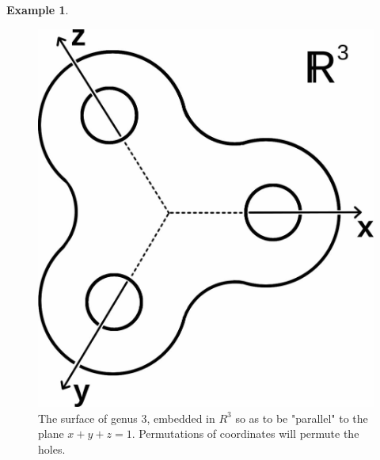 \documentclass[11pt,a4paper,twoside]{article}
\theoremstyle{plain}
\theoremstyle{definition}
\theoremstyle{definition}
\theoremstyle{definition}
\theoremstyle{definition}
\newtheorem{example}[thm]{Example}
\theoremstyle{definition}
\begin{document}
\begin{example}
\label{Ex:S3onGenus3Surface}

\begin{figure}
\centering
\begin{minipage}{.48\textwidth}
  \centering
\includegraphics[scale=0.15]{Images/Genus3ActionCrossSection.jpg}
    \vspace{-4mm}
    \caption{The surface of genus $3$, embedded in $R^3$ so as to be "parallel" to the plane $x+y+z=1$. Permutations of coordinates will permute the holes. }
    \label{Fig:S3onGenus3Surface}


\end{minipage}
\end{figure}
\end{example}
\end{document}
